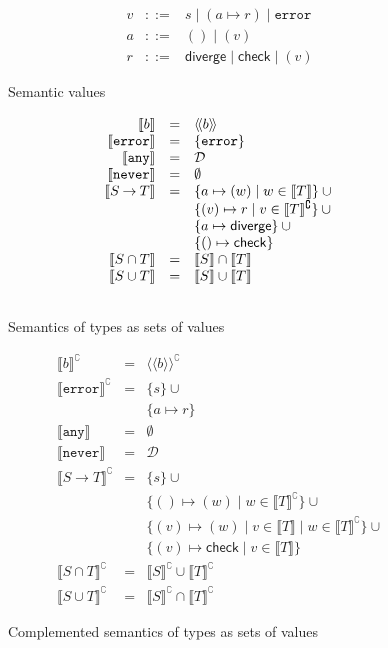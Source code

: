 \documentclass[acmsmall,review,screen]{acmart}
\newcommand{\NEVER}{\mathtt{never}}
\newcommand{\ANY}{\mathtt{any}}
\newcommand{\ERROR}{\mathtt{error}}
\newcommand{\DIVERGE}{\mathsf{diverge}}
\newcommand{\CHECK}{\mathsf{check}}
\newcommand{\fun}{\mathbin{\rightarrow}}
\newcommand{\sem}[1]{\llbracket{#1}\rrbracket}
\newcommand{\ssem}[1]{\langle\!\langle{#1}\rangle\!\rangle}
\newcommand{\nsem}[1]{\llbracket{#1}\rrbracket^\complement}
\newcommand{\nssem}[1]{\ssem{#1}^\complement}
\begin{document}
\begin{figure}
  
\[\begin{array}{rcl}
  v & ::= & s \mid (a \mapsto r) \mid \ERROR \\
  a & ::= & () \mid (v) \\
  r & ::= & \DIVERGE \mid \CHECK \mid (v) 
\end{array}\]
\caption{Semantic values}
\label{fig:semval}

\[\begin{array}{rcl}
  \sem{b} & = & \ssem{b} \\
  \sem{\ERROR} & = & \{ \ERROR \} \\
  \sem{\ANY} & = & \mathcal{D} \\
  \sem{\NEVER} & = & \emptyset \\
  \sem{S \fun T} & = & \{ a \mapsto (w) \mid w \in \sem{T} \} \cup {} \\
                    && \{ (v) \mapsto r \mid v \in \nsem{T} \} \cup {} \\
                    && \{ a \mapsto \DIVERGE \} \cup {} \\
                    && \{ () \mapsto \CHECK \} \\
  \sem{S \cap T} & = & \sem{S} \cap \sem{T} \\
  \sem{S \cup T} & = & \sem{S} \cup \sem{T} \\[\bigskipamount]
\end{array}\]
\caption{Semantics of types as sets of values}
\label{fig:typsem}

\[\begin{array}{rcl}
  \nsem{b} & = & \nssem{b} \\
  \nsem{\ERROR} & = & \{ s \} \cup {} \\
              && \{ a \mapsto r \} \\
  \sem{\ANY} & = & \emptyset \\
  \sem{\NEVER} & = & \mathcal{D} \\
  \nsem{S \fun T} & = & \{ s \} \cup {} \\
              && \{ () \mapsto (w) \mid w \in \nsem{T} \} \cup {} \\
              && \{ (v) \mapsto (w) \mid v \in \sem{T} \mid w \in \nsem{T} \} \cup {} \\
              && \{ (v) \mapsto \CHECK \mid v \in \sem{T} \} \\
  \nsem{S \cap T} & = & \nsem{S} \cup \nsem{T} \\
  \nsem{S \cup T} & = & \nsem{S} \cap \nsem{T}
\end{array}\]
\caption{Complemented semantics of types as sets of values}

\end{figure}
\end{document}
